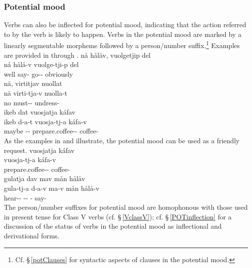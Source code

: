 \subsubsection{Potential mood}\label{POTmood}
Verbs can also be inflected for potential mood, indicating that the action referred to by the verb is likely to happen. Verbs in the potential mood are marked by a linearly segmentable morpheme  followed by a person/number suffix.\footnote{Cf. §\,\ref{potClauses} for syntactic aspects of clauses in the potential mood.} 
Examples are provided in  through .
\ea\label{potentialEx1}
\glll	nå hålåv, vuolgetjip del\\
	nå hålå-v vuolge-tji-p del\\
	well say- go-- obviously\\\nopagebreak
{}	
\z
\ea\label{potentialEx2}
\glll	nä, virtitjav nuollat\\
	nä virti-tja-v nuolla-t\\
	no must-- undress-\\\nopagebreak
{}	
\z
\ea\label{potentialEx3}
\glll	ikeb dat vuosjatja káfav\\
	ikeb d-a-t vuosja-tj-a káfa-v\\
	maybe -- prepare.coffee-- coffee-\\\nopagebreak
{}	
\z
As the examples in  and  illustrate, the potential mood can be used as a friendly request. 
\ea\label{potentialEx4}%
\glll	vuosjatja káfav\\
	vuosja-tj-a káfa-v\\
	prepare.coffee-- coffee-\\\nopagebreak
{}	
\z
\ea\label{potentialEx5}%
\glll	gulatja dav mav mån hålåv\\
	gula-tj-a d-a-v ma-v mån hålå-v\\
	hear-- -- -  say-\\\nopagebreak
{}	
\z
The person/number suffixes for potential mood are homophonous %
with those used in present tense for Class V verbs (cf. §\,\ref{VclassV}); cf. §\,\ref{POTinflection} for a discussion of the status of verbs in the potential mood as inflectional and derivational forms. 


